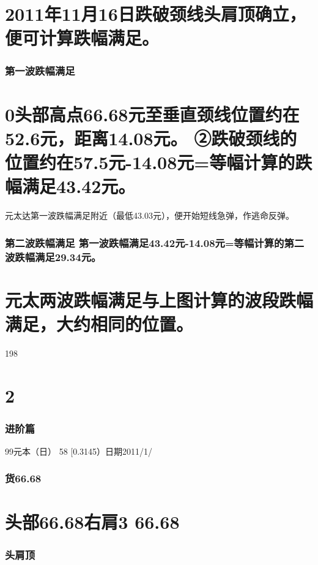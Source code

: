 \documentclass{article}
\begin{document}
\section{2011年11月16日跌破颈线头肩顶确立，便可计算跌幅满足。}

\subsubsection{第一波跌幅满足}

\section{0头部高点66.68元至垂直颈线位置约在52.6元，距离14.08元。 ②跌破颈线的位置约在57.5元-14.08元=等幅计算的跌幅满足43.42元。}

元太达第一波跌幅满足附近（最低43.03元），便开始短线急弹，作逃命反弹。

\subsubsection{第二波跌幅满足 第一波跌幅满足43.42元-14.08元=等幅计算的第二波跌幅满足29.34元。}

\section{元太两波跌幅满足与上图计算的波段跌幅满足，大约相同的位置。}

198

\clearpage

\section{2}

\subsubsection{进阶篇}

99元本（日） 58 [0.3145）日期2011/1/

\subsubsection{货66.68}

\section{头部66.68右肩3 66.68}

\subsubsection{头肩顶}
\end{document}
